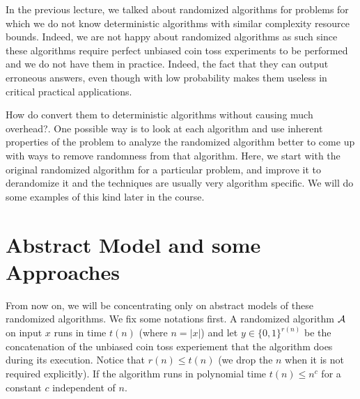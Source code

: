 \noindent 

In the previous lecture, we talked about randomized algorithms for problems for which we do not know deterministic algorithms with similar complexity resource bounds. Indeed, we are not happy about randomized algorithms as such since these algorithms require perfect unbiased coin toss experiments to be performed and we do not have them in practice. Indeed, the fact that they can output erroneous answers, even though with low probability makes them useless in critical practical applications.

How do convert them to deterministic algorithms without causing much overhead?. One possible way is to look at each algorithm and use inherent properties of the problem to analyze the randomized algorithm better to come up with ways to remove randomness from that algorithm. Here, we start with the original randomized algorithm for a particular problem, and improve it to derandomize it and the techniques are usually very algorithm specific. We will do some examples of this kind later in the course.


\section{Abstract Model and some Approaches}

From now on, we will be concentrating only on abstract models of these randomized algorithms. We fix some notations first. A randomized algorithm ${\cal{A}}$ on input $x$ runs in time $t(n)$ (where $n=|x|$) and let $y \in \{0,1\}^{r(n)}$ be the concatenation of the unbiased coin toss experiement that the algorithm does during its execution. Notice that $r(n) \le t(n)$ (we drop the $n$ when it is not required explicitly). If the algorithm runs in polynomial time $t(n) \le n^c$ for a constant $c$ independent of $n$. \\


